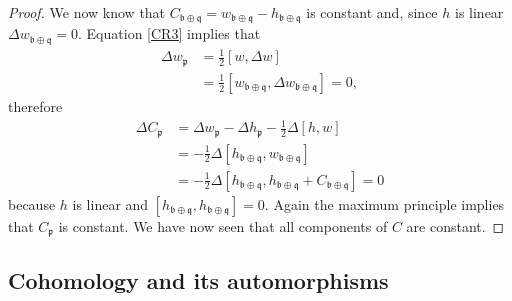 \documentclass[11pt]{amsart}
\newcommand{\bb}{\mathfrak{b}}
\newcommand{\pp}{\mathfrak{p}}
\newcommand{\qq}{\mathfrak{q}}
\numberwithin{equation}{section}
\theoremstyle{definition}
\theoremstyle{remark}
\begin{document}
\begin{proof}
We now know that $C_{\bb\oplus\qq}=w_{\bb\oplus\qq}-h_{\bb\oplus\qq}$ is constant and, since $h$ is linear $\Delta w_{\bb\oplus\qq}=0$. Equation \eqref{CR3} implies that
\begin{align*}
\Delta w_{\pp}&=\frac{1}{2}[w,\Delta w]\\
&=\frac{1}{2}[w_{\bb\oplus\qq},\Delta w_{\bb\oplus\qq}]=0,
\end{align*}
therefore
\begin{align*}
\Delta C_{\pp}&=\Delta w_{\pp}-\Delta h_{\pp}-\frac{1}{2}\Delta[h,w]\\
&=-\frac{1}{2}\Delta[h_{\bb\oplus\qq},w_{\bb\oplus\qq}]\\
&=-\frac{1}{2}\Delta[h_{\bb\oplus\qq},h_{\bb\oplus\qq}+C_{\bb\oplus\qq}]=0
\end{align*}
because $h$ is linear and $[h_{\bb\oplus\qq},h_{\bb\oplus\qq}]=0$. Again the maximum principle implies that $C_{\pp}$ is constant. We have now seen that all components of $C$ are constant.
\end{proof}


\subsection{Cohomology and its automorphisms}\label{coh}
\end{document}

